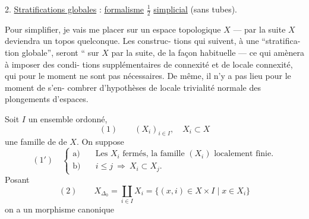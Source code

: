 2. \uline{Stratifications globales} : \uline{formalisme} $\frac12$ \uline{simplicial}
(sans tubes).

Pour simplifier, je vais me placer sur un
espace topologique $X$ --- par la suite $X$
deviendra un topos quelconque. Les construc-
tions qui suivent,  à une ``stratifica-
tion globale'', seront `` sur $X$
par la suite, de la façon habituelle ---
ce qui amènera  à imposer des condi-
tions supplémentaires de connexité et
de locale connexité, qui pour le moment
ne sont pas nécessaires. De même, il n'y
a pas lieu pour le moment de s'en-
combrer d'hypothèses de locale trivialité
normale des plongements d'espaces.

Soit $I$ un ensemble ordonné, 
\[
(1)\qquad (X_i)_{i\in I},\quad X_i\subset X
\]
une famille de  de $X$. On suppose
\[
(1')\quad\left\{\begin{aligned}
\text{a)}\quad&\text{Les }X_i\text{ fermés, la famille }(X_i)\text{ localement finie.}\\
\text{b)}\quad&i\leq j\ \Longrightarrow\ X_i\subset X_j.
\end{aligned}\right.
\]
Posant
\[
(2)\qquad X_{\Delta_0}=\coprod_{i\in I}X_i
=\{(x,i)\in X\times I\mid x\in X_i\}
\]
on a un morphisme canonique
